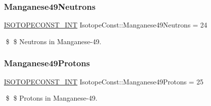 \subsubsection{\texorpdfstring{Manganese49\+Neutrons}{Manganese49Neutrons}}
{\footnotesize\ttfamily \mbox{\hyperlink{group___isotope_const-_macros_ga5f18360b3e99483a35c32d789e62621c}{I\+S\+O\+T\+O\+P\+E\+C\+O\+N\+S\+T\+\_\+\+I\+NT}} Isotope\+Const\+::\+Manganese49\+Neutrons = 24}

\$ \$ Neutrons in Manganese-\/49. \mbox{\label{group___isotope_const-_manganese-_mn49_gaf89ebc6128b98cc75eab60aebaf1a8c8}} 
\subsubsection{\texorpdfstring{Manganese49\+Protons}{Manganese49Protons}}
{\footnotesize\ttfamily \mbox{\hyperlink{group___isotope_const-_macros_ga5f18360b3e99483a35c32d789e62621c}{I\+S\+O\+T\+O\+P\+E\+C\+O\+N\+S\+T\+\_\+\+I\+NT}} Isotope\+Const\+::\+Manganese49\+Protons = 25}

\$ \$ Protons in Manganese-\/49. 